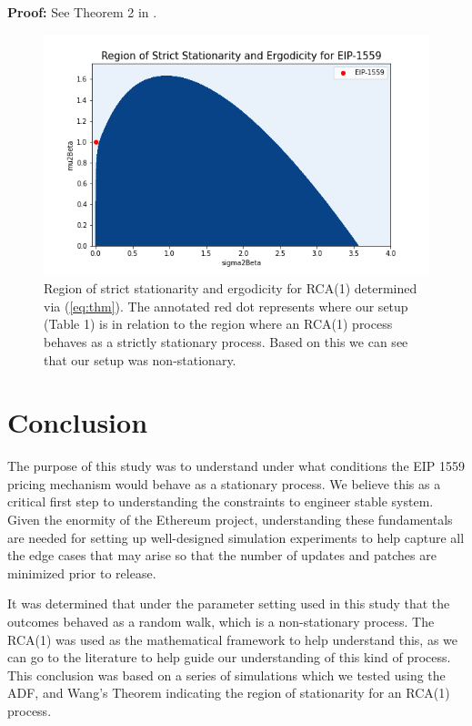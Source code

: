 \documentclass{article}
\begin{document}
\textbf{Proof:} See Theorem 2 in \cite{Wan03}.

\begin{figure}
\centering
\includegraphics[width=5in]{strict_stationarity.png}
\caption{Region of strict stationarity and ergodicity for RCA(1) determined via (\ref{eq:thm}). The annotated red dot represents where our setup (Table 1) is in relation to the region where an RCA(1) process behaves as a strictly stationary process. Based on this we can see that our setup was non-stationary.} 
\label{fig:strict_stationarity}
\end{figure} 

\section{Conclusion}
\label{section:conclusion}

The purpose of this study was to understand under what conditions the EIP 1559 pricing mechanism would behave as a stationary process. We believe this as a critical first step to understanding the constraints to engineer stable system. Given the enormity of the Ethereum project, understanding these fundamentals are needed for setting up well-designed simulation experiments to help capture all the edge cases that may arise so that the number of updates and patches are minimized prior to release.

It was determined that under the parameter setting used in this study that the outcomes behaved as a random walk, which is a non-stationary process. The RCA(1) was used as the mathematical framework to help understand this, as we can go to the literature to help guide our understanding of this kind of process. This conclusion was based on a series of simulations which we tested using the ADF, and Wang's Theorem indicating the region of stationarity for an RCA(1) process. 
\end{document}
